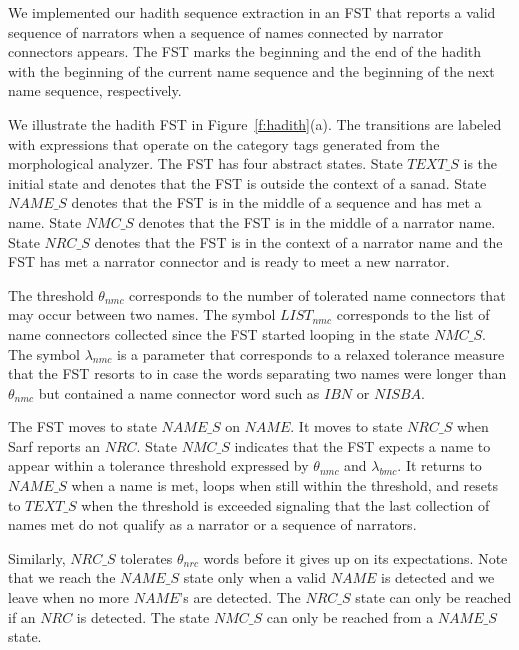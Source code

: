 \documentclass{llncs}
\begin{document}
We implemented our hadith sequence extraction 
in an FST that reports a valid sequence
of narrators when a sequence of names
connected by narrator connectors appears. 
The FST marks the beginning and the end of the hadith with 
the beginning of the current name sequence
and the beginning of the next name sequence, respectively.

We illustrate the hadith FST
in Figure~\ref{f:hadith}(a). 
The transitions are  labeled with expressions
that operate on the category tags 
generated from the morphological analyzer.
The FST has four abstract states.
State $\mathit{TEXT\_S}$ is the initial state and denotes 
that the FST is outside the context of a sanad.
State $\mathit{NAME\_S}$ denotes that the FST is in
the middle of a sequence and has met a name. 
State $\mathit{NMC\_S}$ denotes that the FST is in
the middle of a narrator name.
State $\mathit{NRC\_S}$ denotes that the FST is 
in the context of a narrator name and the FST 
has met a narrator connector and is ready to meet 
a new narrator. 

The threshold $\theta_{\mathit{nmc}}$ 
corresponds to the number of tolerated name connectors 
that may occur between two names. %
The symbol $\mathit{LIST}_{\mathit{nmc}}$ corresponds to the list 
of name connectors collected since the FST
started looping in the state $\mathit{NMC\_S}$.
The symbol $\lambda_{\mathit{nmc}}$ is a parameter 
that corresponds to a relaxed tolerance measure that
the FST resorts to in case the words separating
two names were longer than $\theta_{\mathit{nmc}}$ but 
contained a name connector word such as $\mathit{IBN}$ 
or $\mathit{NISBA}$.

The FST moves to state $\mathit{NAME\_S}$ on
$\mathit{NAME}$.
It moves to state $\mathit{NRC\_S}$ 
when Sarf reports an $\mathit{NRC}$.
State $\mathit{NMC\_S}$
indicates that the FST expects a name to appear within 
a tolerance threshold expressed by 
$\theta_{\mathit{nmc}}$ and $\lambda_{\mathit{bmc}}$.
It returns to $\mathit{NAME\_S}$ when a name is met, 
loops when still within the threshold, and 
resets to $\mathit{TEXT\_S}$ when the threshold is exceeded 
signaling that the last collection of names met do not qualify
as a narrator or a sequence of narrators. 

Similarly, $\mathit{NRC\_S}$ 
tolerates $\theta_{\mathit{nrc}}$ words 
before it gives up on its expectations. 
Note that we reach the $\mathit{NAME\_S}$
state only when a
valid $\mathit{NAME}$ is detected and we leave when no 
more $\mathit{NAME}$'s are detected.
The $\mathit{NRC\_S}$ state can only be reached if an 
$\mathit{NRC}$ is detected.
The state $\mathit{NMC\_S}$ can only be reached from a 
$\mathit{NAME\_S}$ state.
\end{document}
